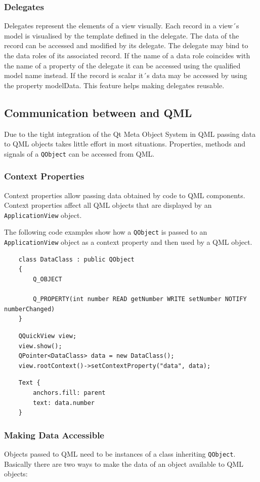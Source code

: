\subsubsection {Delegates}
Delegates represent the elements of a view visually. Each record in a view´s model is visualised by the template defined in the delegate. The data of the record can be accessed and modified by its delegate. The delegate may bind to the data roles of its associated record. If the name of a data role coincides with the name of a property of the delegate it can be accessed using the qualified model name instead. If the record is scalar it´s data may be accessed by using the property modelData. 
This feature helps making delegates reusable. 

\subsection{Communication between \cpp and QML}
Due to the tight integration of the Qt Meta Object System in QML passing data to QML objects takes little effort in most situations. Properties, methods and signals of a {\tt QObject} can be accessed from QML.

\subsubsection{Context Properties}
Context properties allow passing data obtained by \cpp code to QML components. Context properties affect all QML objects that are displayed by an {\tt ApplicationView} object. 

The following code examples show how a {\tt QObject} is passed to an {\tt ApplicationView} object as a context property and then used by a QML object.
\begin{lstlisting}
	class DataClass : public QObject
	{
	    Q_OBJECT
	
	    Q_PROPERTY(int number READ getNumber WRITE setNumber NOTIFY numberChanged)
	}
\end{lstlisting}
\begin{lstlisting}
	QQuickView view;
	view.show();
	QPointer<DataClass> data = new DataClass();
	view.rootContext()->setContextProperty("data", data);
\end{lstlisting}

\begin{lstlisting}
	Text {
		anchors.fill: parent
	    text: data.number
	}
\end{lstlisting}

\subsubsection{Making Data Accessible}
Objects passed to QML need to be instances of a class inheriting {\tt QObject}.
Basically there are two ways to make the data of an object available to QML objects:


